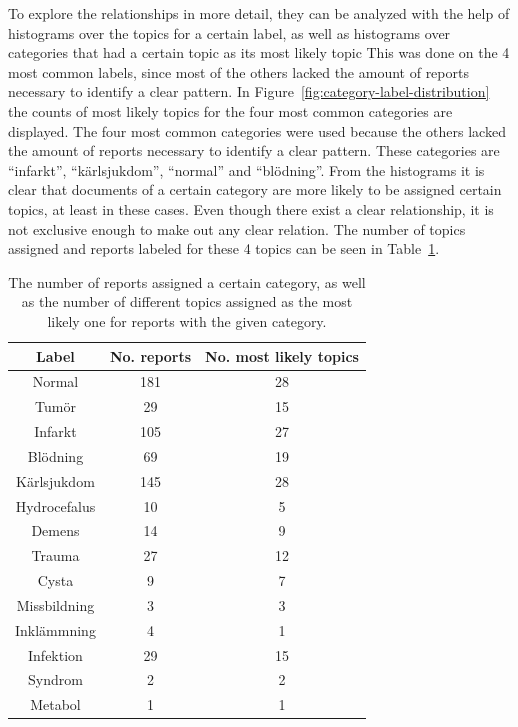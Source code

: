 To explore the relationships in more detail, they can be analyzed with the help of histograms over the topics for a certain label, as well as histograms over categories that had a certain topic as its most likely topic
This was done on the 4 most common labels, since most of the others lacked the amount of reports necessary to identify a clear pattern.
In Figure~\ref{fig:category-label-distribution} the counts of most likely topics for the four most common categories are displayed.
The four most common categories were used because the others lacked the amount of reports necessary to identify a clear pattern.
These categories are ``infarkt'', ``kärlsjukdom'', ``normal'' and ``blödning''.
From the histograms it is clear that documents of a certain category are more likely to be assigned certain topics, at least in these cases.
Even though there exist a clear relationship, it is not exclusive enough to make out any clear relation.
The number of topics assigned and reports labeled for these 4 topics can be seen in Table~\ref{tab:topic-categories}.

\begin{table}
    \centering
    \begin{tabular}{|c|cc|}
        \hline
        \textbf{Label} & \textbf{No. reports} & \textbf{No. most likely topics} \\
        \hline
        Normal & 181 & 28\\
        Tumör & 29 & 15\\
        Infarkt & 105 & 27\\
        Blödning & 69 & 19\\
        Kärlsjukdom & 145 & 28\\
        Hydrocefalus & 10 & 5\\
        Demens & 14 & 9\\
        Trauma & 27 & 12\\
        Cysta & 9 & 7\\
        Missbildning & 3 & 3\\
        Inklämmning & 4 & 1\\
        Infektion & 29 & 15\\
        Syndrom & 2 & 2\\
        Metabol & 1 & 1\\
        \hline
    \end{tabular}
    \caption{The number of reports assigned a certain category, as well as the number of different topics assigned as the most likely one for reports with the given category.}
    \label{tab:topic-categories}
\end{table}

